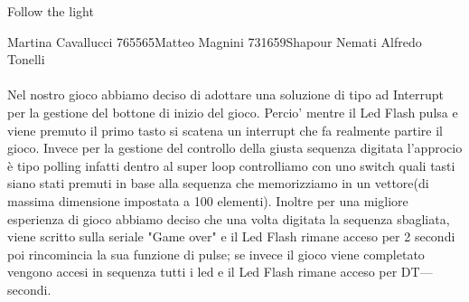 \documentclass[a4paper]{article}
\begin{document}
	\begin{center}{\Huge \centering  Follow the light }
			\end{center}
	{\fontsize{10}{12} Martina Cavallucci  765565\newline Matteo Magnini      731659\newline Shapour Nemati\newline
		 Alfredo Tonelli}
	
	\paragraph{}
	Nel nostro gioco abbiamo deciso di adottare una soluzione di tipo ad Interrupt per la gestione del bottone di inizio del gioco. Percio' mentre il Led Flash pulsa e viene premuto il primo tasto si scatena un interrupt che fa realmente partire il gioco.
	Invece per la gestione del controllo della giusta sequenza digitata l'approcio è tipo polling infatti dentro al super loop controlliamo con uno switch quali tasti siano stati premuti in base alla sequenza che memorizziamo in un vettore(di massima dimensione impostata a  100 elementi).
	Inoltre per una migliore esperienza di gioco abbiamo deciso che una volta digitata la sequenza sbagliata, viene scritto sulla seriale "Game over" e il Led Flash rimane acceso per 2 secondi poi rincomincia la sua funzione di pulse; se invece il gioco viene completato vengono accesi in sequenza tutti i led e il Led Flash rimane acceso per DT--- secondi.
\end{document}
